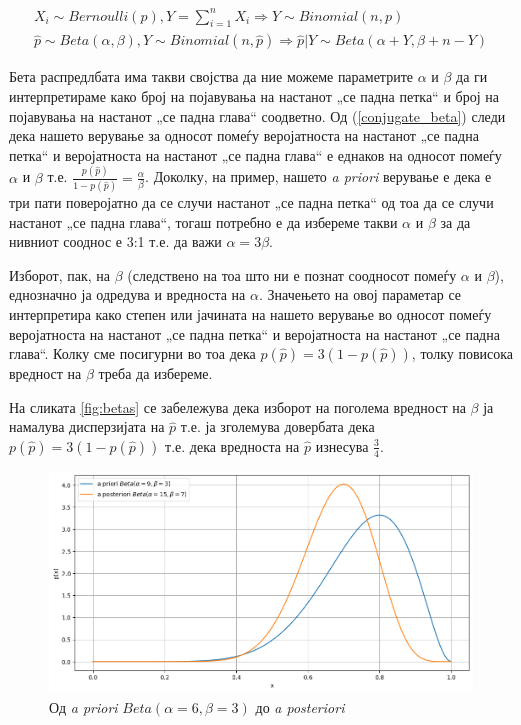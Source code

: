\documentclass[12pt]{article}
\numberwithin{equation}{section}
\begin{document}
\begin{equation}\label{conjugate_beta}
  \begin{gathered}
    X_i \sim Bernoulli(p), Y=\sum_{i=1}^{n} X_i \Rightarrow Y \sim Binomial(n, p)\\
    \widehat{p} \sim Beta(\alpha, \beta), Y \sim Binomial(n, \widehat{p}) \Rightarrow \widehat{p}|Y \sim Beta(\alpha + Y, \beta + n - Y)
  \end{gathered}
\end{equation}

Бета распредлбата има такви својства да ние можеме параметрите \(\alpha\) и \(\beta\) да ги интерпретираме како број на појавувања на настанот „се падна петка“ и број на појавувања на настанот „се падна глава“ соодветно. Од (\ref{conjugate_beta}) следи дека нашето верување за односот помеѓу веројатноста на настанот „се падна петка“ и веројатноста на настанот „се падна глава“ е еднаков на односот помеѓу \(\alpha\) и \(\beta\) т.е. \(\frac{p(\widehat{p})}{1 - p(\widehat{p})} = \frac{\alpha}{\beta}\). Доколку, на пример, нашето \textit{a priori} верување е дека е три пати поверојатно да се случи настанот „се падна петка“ од тоа да се случи настанот „се падна глава“, тогаш потребно е да избереме такви \(\alpha\) и \(\beta\) за да нивниот сооднос е 3:1 т.е. да важи \(\alpha=3\beta\).

Изборот, пак, на \(\beta\) (следствено на тоа што ни е познат соодносот помеѓу \(\alpha\) и \(\beta\)), еднозначно ја одредува и вредноста на \(\alpha\). Значењето на овој параметар се интерпретира како степен или јачината на нашето верување во односот помеѓу веројатноста на настанот „се падна петка“ и веројатноста на настанот „се падна глава“. Колку сме посигурни во тоа дека \(p(\widehat{p}) = 3(1 - p(\widehat{p}))\), толку повисока вредност на \(\beta\) треба да избереме.

На сликата \ref{fig:betas} се забележува дека изборот на поголема вредност на \(\beta\) ја намалува дисперзијата на \(\widehat{p}\) т.е. ја зголемува довербата дека \(p(\widehat{p}) = 3(1 - p(\widehat{p}))\) т.е. дека вредноста на \(\widehat{p}\) изнесува \(\frac{3}{4}\).

\begin{figure}[h]
    \centering
    \includegraphics[width=1\textwidth]{plots/beta_prior_to_posterior.png}
    \caption{Од \textit{a priori} \(Beta(\alpha=6, \beta=3)\) до \textit{a posteriori}}
    \label{fig:beta_prior_to_posterior}
\end{figure}
\end{document}

